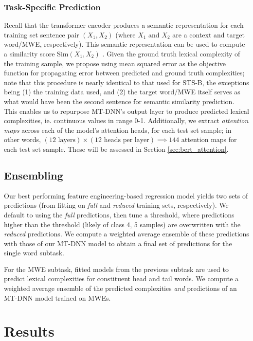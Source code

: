 \documentclass{dcthesis}
\theoremstyle{definition}
\theoremstyle{remark}
\begin{document}
\subsection{Task-Specific Prediction}

Recall that the transformer encoder produces a semantic representation for each training set sentence pair $(X_1, X_2)$ (where $X_1$ and $X_2$ are a context and target word/MWE, respectively). This semantic representation can be used to compute a similarity score $\text{Sim}(X_1, X_2)$ \citep{liu2019multi}. Given the ground truth lexical complexity of the training sample, we propose using mean squared error as the objective function for propagating error between predicted and ground truth complexities; note that this procedure is nearly identical to that used for STS-B, the exceptions being (1) the training data used, and (2) the target word/MWE itself serves as what would have been the second sentence for semantic similarity prediction. This enables us to repurpose MT-DNN's output layer to produce predicted lexical complexities, ie. continuous values in range 0-1. Additionally, we extract \textit{attention maps} across each of the model's attention heads, for each test set sample; in other words, $(12 \text{ layers}) \times (12 \text{ heads per layer}) \implies 144$ attention maps for each test set sample. These will be assessed in Section \ref{sec:bert_attention}.

\section{Ensembling}

Our best performing feature engineering-based regression model yields two sets of predictions (from fitting on \textit{full} and \textit{reduced} training sets, respectively). We default to using the \textit{full} predictions, then tune a threshold, where predictions higher than the threshold (likely of class 4, 5 samples) are overwritten with the \textit{reduced} predictions. We compute a weighted average ensemble of these predictions with those of our MT-DNN model to obtain a final set of predictions for the single word subtask. 

For the MWE subtask, fitted models from the previous subtask are used to predict lexical complexities for constituent head and tail words. We compute a weighted average ensemble of the predicted complexities \textit{and} predictions of an MT-DNN model trained on MWEs.

\chapter{Results}
\end{document}
